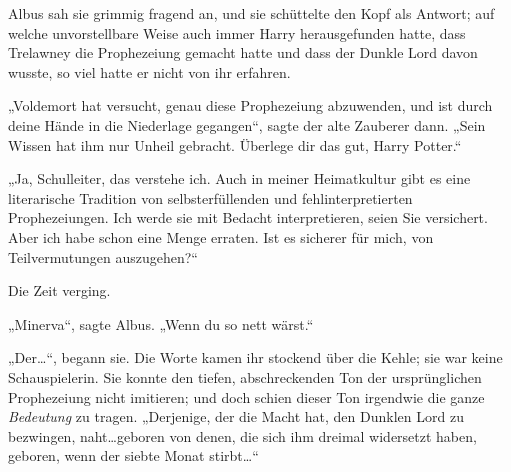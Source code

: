 Albus sah sie grimmig fragend an, und sie schüttelte den Kopf als Antwort; auf welche unvorstellbare Weise auch immer Harry herausgefunden hatte, dass Trelawney die Prophezeiung gemacht hatte und dass der Dunkle Lord davon wusste, so viel hatte er nicht von ihr erfahren.

„Voldemort hat versucht, genau diese Prophezeiung abzuwenden, und ist durch deine Hände in die Niederlage gegangen“, sagte der alte Zauberer dann. „Sein Wissen hat ihm nur Unheil gebracht. Überlege dir das gut, Harry Potter.“

„Ja, Schulleiter, das verstehe ich. Auch in meiner Heimatkultur gibt es eine literarische Tradition von selbsterfüllenden und fehlinterpretierten Prophezeiungen. Ich werde sie mit Bedacht interpretieren, seien Sie versichert. Aber ich habe schon eine Menge erraten. Ist es sicherer für mich, von Teilvermutungen auszugehen?“

Die Zeit verging.

„Minerva“, sagte Albus. „Wenn du so nett wärst.“

„Der…“, begann sie. Die Worte kamen ihr stockend über die Kehle; sie war keine Schauspielerin. Sie konnte den tiefen, abschreckenden Ton der ursprünglichen Prophezeiung nicht imitieren; und doch schien dieser Ton irgendwie die ganze \emph{Bedeutung} zu tragen. „Derjenige, der die Macht hat, den Dunklen Lord zu bezwingen, naht…geboren von denen, die sich ihm dreimal widersetzt haben, geboren, wenn der siebte Monat stirbt…“

